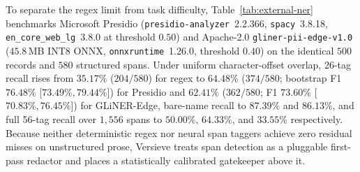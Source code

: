 \documentclass{article}
\begin{document}
\begin{table}[t]
\caption{External NER baselines on the identical $500$ \texttt{ai4privacy-200k} records ($580$ structured $26$-tag spans; $238$ bare-name spans; character-offset overlap with Wilson $95\%$ intervals; seed-$42$, $1{,}000$-resample bootstrap F1). Under the exact value-substring rule of Figure~\ref{fig:pii}, Versieve regex recalls $31.0\%$ ($180/580$).}
\label{tab:external-ner}
\vskip 0.08in
\begin{center}
\end{center}
\vskip -0.14in
\end{table}

To separate the regex limit from task difficulty, Table~\ref{tab:external-ner} benchmarks Microsoft Presidio (\texttt{presidio-analyzer}~2.2.366, \texttt{spacy}~3.8.18, \texttt{en\_core\_web\_lg}~3.8.0 at threshold $0.50$) and Apache-2.0 \texttt{gliner-pii-edge-v1.0} ($45.8$\,MB INT8 ONNX, \texttt{onnxruntime}~1.26.0, threshold $0.40$) on the identical $500$ records and $580$ structured spans. Under uniform character-offset overlap, 26-tag recall rises from $35.17\%$ ($204/580$) for regex to $64.48\%$ ($374/580$; bootstrap F1 $76.48\%$ [$73.49\%, 79.44\%$]) for Presidio and $62.41\%$ ($362/580$; F1 $73.60\%$ [$70.83\%, 76.45\%$]) for GLiNER-Edge, bare-name recall to $87.39\%$ and $86.13\%$, and full 56-tag recall over $1{,}556$ spans to $50.00\%$, $64.33\%$, and $33.55\%$ respectively. Because neither deterministic regex nor neural span taggers achieve zero residual misses on unstructured prose, Versieve treats span detection as a pluggable first-pass redactor and places a statistically calibrated gatekeeper above it.
\end{document}
